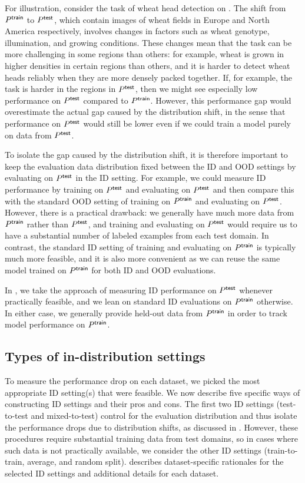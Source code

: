For illustration, consider the task of wheat head detection on \Wheat.
The shift from $P^\mathsf{train}$ to $P^\mathsf{test}$, which contain images of wheat fields in Europe and North America respectively, involves changes in factors such as wheat genotype, illumination, and growing conditions.
These changes mean that the task can be more challenging in some regions than others:
for example, wheat is grown in higher densities in certain regions than others, and it is harder to detect wheat heads reliably when they are more densely packed together.
If, for example, the task is harder in the regions in $P^\mathsf{test}$, then we might see especially low performance on $P^\mathsf{test}$ compared to $P^\mathsf{train}$. However, this performance gap would overestimate the actual gap caused by the distribution shift, in the sense that performance on $P^\mathsf{test}$ would still be lower even if we could train a model purely on data from $P^\mathsf{test}$.

To isolate the gap caused by the distribution shift, it is therefore important to keep the evaluation data distribution fixed between the ID and OOD settings by evaluating on $P^\mathsf{test}$ in the ID setting.
For example, we could measure ID performance by training on $P^\mathsf{test}$ and evaluating on $P^\mathsf{test}$ and then compare this with the standard OOD setting of training on $P^\mathsf{train}$ and evaluating on $P^\mathsf{test}$.
However, there is a practical drawback: we generally have much more data from $P^\mathsf{train}$ rather than $P^\mathsf{test}$, and training and evaluating on $P^\mathsf{test}$ would require us to have a substantial number of labeled examples from each test domain.
In contrast, the standard ID setting of training and evaluating on $P^\mathsf{train}$ is typically much more feasible, and it is also more convenient as we can reuse the same model trained on $P^\mathsf{train}$ for both ID and OOD evaluations.

In \Wilds, we take the approach of measuring ID performance on $P^\mathsf{test}$ whenever practically feasible, and we lean on standard ID evaluations on $P^\mathsf{train}$ otherwise.
In either case, we generally provide held-out data from $P^\mathsf{train}$ in order to track model performance on $P^\mathsf{train}$.

\subsection{Types of in-distribution settings}
\label{sec:indist-types}

To measure the performance drop on each \Wilds dataset, we picked the most appropriate ID setting(s) that were feasible.
We now describe five specific ways of constructing ID settings and their pros and cons.
The first two ID settings (test-to-test and mixed-to-test) control for the evaluation distribution and thus isolate the performance drops due to distribution shifts, as discussed in .
However, these procedures require substantial training data from test domains, so in cases where such data is not practically available, we consider the other ID settings (train-to-train, average, and random split).
 describes dataset-specific rationales for the selected ID settings and additional details for each dataset.

